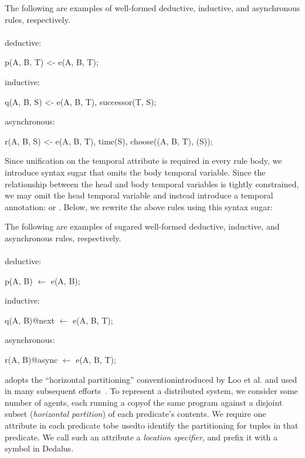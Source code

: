 \begin{example}
The following are examples of well-formed deductive, inductive, and asynchronous rules, respectively.
\\\\
deductive:
\begin{Dedalus}
p(A, B, T) <- e(A, B, T);
\end{Dedalus}
inductive:
\begin{Dedalus}
q(A, B, S) <- e(A, B, T), successor(T, S);
\end{Dedalus}
asynchronous:
\begin{Dedalus}
r(A, B, S) <- e(A, B, T), time(S),
              choose((A, B, T), (S));
\end{Dedalus}
\end{example}

Since unification on the temporal attribute is required in every rule body, we introduce syntax sugar that omits the body temporal variable.  Since the relationship between the head and body temporal variables is tightly constrained, we may omit the head temporal variable and instead introduce a temporal annotation:  or .  Below, we rewrite the above rules using this syntax sugar:

\begin{example}
The following are examples of sugared well-formed deductive, inductive, and asynchronous rules, respectively.
\\\\
deductive:
\begin{Dedalus}
p(A, B) \(\leftarrow\) e(A, B);
\end{Dedalus}
inductive:
\begin{Dedalus}
q(A, B)@next \(\leftarrow\) e(A, B, T);
\end{Dedalus}
asynchronous:
\begin{Dedalus}
r(A, B)@async \(\leftarrow\) e(A, B, T);
\end{Dedalus}
\end{example}

\lang adopts the ``horizontal partitioning'' conventionintroduced by Loo et al. and used in many subsequent efforts~\cite{Loo:2005}. To represent a distributed system, we consider some number of agents, each running a copyof the same program against a disjoint subset ({\em horizontal partition}) of each predicate's contents.  We require one attribute in each predicate tobe usedto identify the partitioning for tuples in that predicate. We call such an attribute a {\em location specifier}, and prefix it with a \dedalus{\#} symbol in Dedalus.

